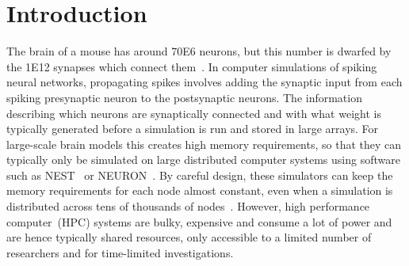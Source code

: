 \documentclass[9pt,a4paper]{amsart}
\newcommand{\todo}[1]{\textbf{\textsc{\textcolor{red}{(TODO: #1)}}}}
\begin{document}
\section{Introduction}
The brain of a mouse has around \num{70E6} neurons, but this number is dwarfed by the \num{1E12} synapses which connect them~\citep{Herculano-Houzel2010}.
In computer simulations of spiking neural networks, propagating spikes involves  adding the synaptic input from each spiking presynaptic neuron to the postsynaptic neurons.
The information describing which neurons are synaptically connected and with what weight is typically generated before a simulation is run and stored in large arrays. 
For large-scale brain models this creates high memory requirements, so that they can typically only be simulated on large distributed computer systems using software such as NEST~\citep{Gewaltig2007} or NEURON~\citep{carnevale2006neuron}.
By careful design, these simulators can keep the memory requirements for each node almost constant, even when a simulation is distributed across tens of thousands of nodes~\citep{Jordan2018}.
However, high performance computer~(HPC) systems are bulky, expensive and consume a lot of power and are hence typically shared resources, only accessible to a limited number of researchers and for time-limited investigations.
\end{document}
